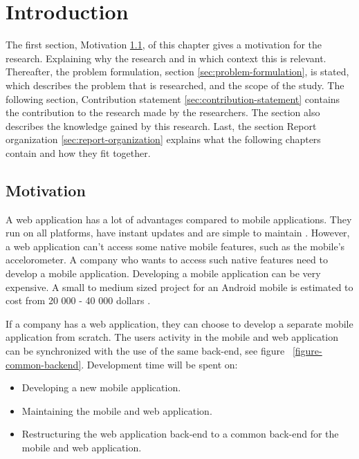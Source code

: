 \chapter{Introduction}\label{ch:introduction}
The first section, Motivation \ref{sec:motivation}, of this chapter gives a motivation for the research. Explaining why the research and in which context this is relevant. Thereafter, the problem formulation, section \ref{sec:problem-formulation}, is stated, which describes the problem that is researched, and the scope of the study. The following section, Contribution statement \ref{sec:contribution-statement} contains the contribution to the research made by the researchers. The section also describes the knowledge gained by this research. Last, the section Report organization \ref{sec:report-organization} explains what the following chapters contain and how they fit together.

\section{Motivation}\label{sec:motivation}
A web application has a lot of advantages compared to mobile applications. They run on all platforms, have instant updates and are simple to maintain \cite{michaels2013}. However, a web application can't access some native mobile features, such as the mobile's accelorometer. A company who wants to access such native features need to develop a mobile application. Developing a mobile application can be very expensive. A small to medium sized project for an Android mobile is estimated to cost from 20 000 - 40 000 dollars \cite{kohan2015}.

If a company has a web application, they can choose to develop a separate mobile application from scratch. The users activity in the mobile and web application can be synchronized with the use of the same back-end, see figure ~\ref{figure-common-backend}. Development time will be spent on: 
\begin{itemize}
\item Developing a new mobile application.
\item Maintaining the mobile and web application.
\item Restructuring the web application back-end to a common back-end for the mobile and web application.
\end{itemize}


